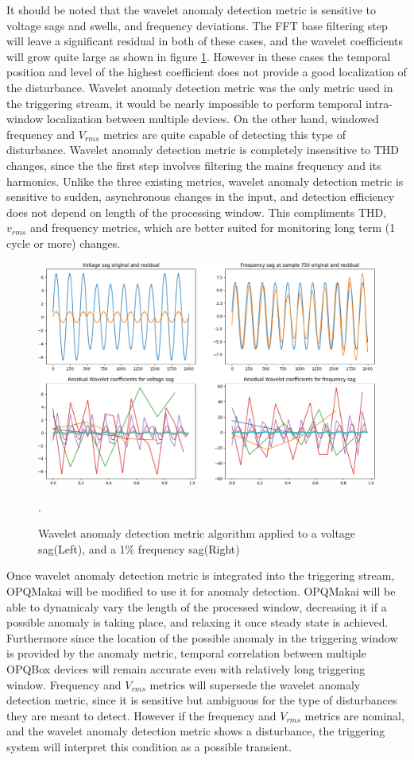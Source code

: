 It should be noted that the wavelet anomaly detection metric is sensitive to voltage sags and swells, and frequency deviations. The FFT base filtering step will leave a significant residual in both of these cases, and the wavelet coefficients will grow quite large as shown in figure \ref{expdes:fig:2}. However in these cases the temporal position and level of the highest coefficient does not provide a good localization of the disturbance. Wavelet anomaly detection metric was the only metric used in the triggering stream, it would be nearly impossible to perform temporal intra-window localization between multiple devices. On the other hand, windowed frequency and $V_{rms}$ metrics are quite capable of detecting this type of disturbance. Wavelet anomaly detection metric is completely insensitive to THD changes, since the the first step involves filtering the mains frequency and its harmonics. Unlike the three existing metrics, wavelet anomaly detection metric is sensitive to sudden, asynchronous changes in the input, and detection efficiency does not depend on length of the processing window. This compliments THD, $v_{rms}$ and frequency metrics, which are better suited for monitoring long term (1 cycle or more) changes.

\begin{figure}[h]
	\centering
	\includegraphics[width=0.8\linewidth]{img/sag_and_freq_wavelet.png}	
	\caption{Wavelet anomaly detection metric algorithm applied to a voltage sag(Left), and a 1\% frequency sag(Right)}.
	\label{expdes:fig:2}
\end{figure}

Once wavelet anomaly detection metric is integrated into the triggering stream, OPQMakai will be modified to use it for anomaly detection. OPQMakai will be able to dynamicaly vary the length of the processed window, decreasing it if a possible anomaly is taking place, and relaxing it once steady state is achieved. Furthermore since the location of the possible anomaly in the triggering window is provided by the anomaly metric, temporal correlation between multiple OPQBox devices will remain accurate even with relatively long triggering window. Frequency and $V_{rms}$ metrics will supersede the wavelet anomaly detection metric, since it is sensitive but ambiguous for the type of disturbances they are meant to detect. However if the frequency and $V_{rms}$ metrics are nominal, and the wavelet anomaly detection metric shows a disturbance, the triggering system will interpret this condition as a possible transient.

